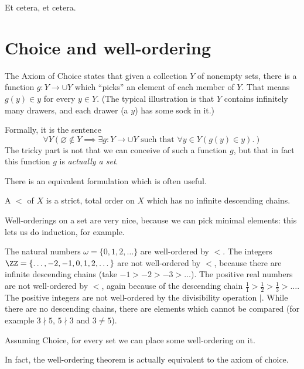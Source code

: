 Et cetera, et cetera.

\section{Choice and well-ordering}
The Axiom of Choice states that given a collection $Y$ of nonempty sets,
there is a function $g : Y \to \cup Y$ which ``picks'' an element of each member of $Y$.
That means $g(y) \in y$ for every $y \in Y$.
(The typical illustration is that $Y$ contains infinitely many drawers,
and each drawer (a $y$) has some sock in it.)

Formally, it is the sentence
\[ \forall Y \left(\varnothing \notin Y
	\implies 
	\exists g : Y \to \cup Y
	\text{ such that }
	\forall y \in Y \left( g(y) \in y \right).
	\right)
\]
The tricky part is not that we can conceive of such a function $g$,
but that in fact this function $g$ is \emph{actually a set}.

There is an equivalent formulation which is often useful.
\begin{definition}
	A  $<$ of $X$ is a strict, total order on $X$
	which has no infinite descending chains.
\end{definition}
Well-orderings on a set are very nice, because we can pick minimal elements:
this lets us do induction, for example.
\begin{example}
	\listhack
	\begin{enumerate}[(a)]
		\ii The natural numbers $\omega = \{0,1,2,\dots\}$
		are well-ordered by $<$.
		\ii The integers $\ZZ = \{\dots,-2,-1,0,1,2,\dots\}$ are not well-ordered by $<$,
		because there are infinite descending chains (take $-1 > -2 > -3 > \dots$).
		\ii The positive real numbers are not well-ordered by $<$,
		again because of the descending chain $\frac11>\frac12>\frac13>\dots$.
		\ii The positive integers are not well-ordered by the divisibility operation $\mid$.
		While there are no descending chains, there are elements which cannot be compared
		(for example $3 \nmid 5$, $5 \nmid 3$ and $3 \neq 5$).
	\end{enumerate}
\end{example}

\begin{theorem}
	Assuming Choice, for every set we can place some well-ordering on it.
\end{theorem}
In fact, the well-ordering theorem is actually equivalent to the axiom of choice.

